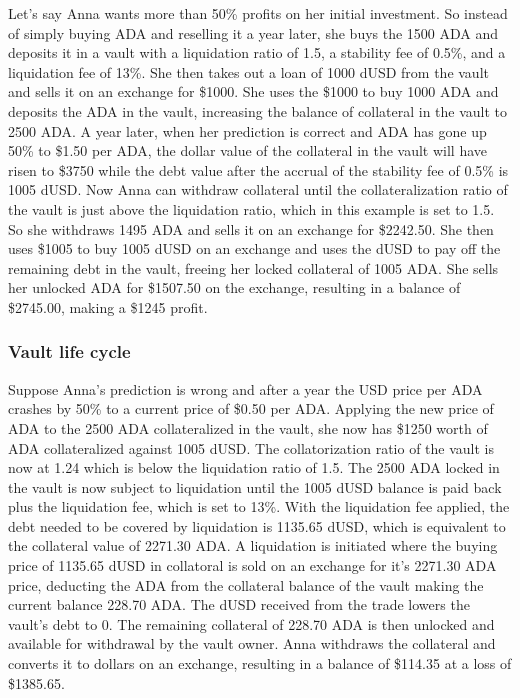 \documentclass[12pt]{article}
\begin{document}
Let's say Anna wants more than 50\% profits on her initial investment. So instead of simply buying ADA and reselling it a year later, she buys the 1500 ADA and deposits it in a vault with a liquidation ratio of 1.5, a stability fee of 0.5\%, and a liquidation fee of 13\%. She then takes out a loan of 1000 dUSD from the vault and sells it on an exchange for \$1000. She uses the \$1000 to buy 1000 ADA and deposits the ADA in the vault, increasing the balance of collateral in the vault to 2500 ADA. A year later, when her prediction is correct and ADA has gone up 50\% to \$1.50 per ADA, the dollar value of the collateral in the vault will have risen to \$3750 while the debt value after the accrual of the stability fee of 0.5\% is 1005 dUSD. Now Anna can withdraw collateral until the collateralization ratio of the vault is just above the liquidation ratio, which in this example is set to 1.5. So she withdraws 1495 ADA and sells it on an exchange for \$2242.50. She then uses \$1005 to buy 1005 dUSD on an exchange and uses the dUSD to pay off the remaining debt in the vault, freeing her locked collateral of 1005 ADA. She sells her unlocked ADA for \$1507.50 on the exchange, resulting in a balance of \$2745.00, making a \$1245 profit.

	\subsubsection{Vault life cycle}

Suppose Anna's prediction is wrong and after a year the USD price per ADA crashes by 50\% to a current price of \$0.50 per ADA. Applying the new price of ADA to the 2500 ADA collateralized in the vault, she now has \$1250 worth of ADA collateralized against 1005 dUSD. The collatorization ratio of the vault is now at 1.24 which is below the liquidation ratio of 1.5. The 2500 ADA locked in the vault is now subject to liquidation until the 1005 dUSD balance is paid back plus the liquidation fee, which is set to 13\%. With the liquidation fee applied, the debt needed to be covered by liquidation is 1135.65 dUSD, which is equivalent to the collateral value of 2271.30 ADA. A liquidation is initiated where the buying price of 1135.65 dUSD in collatoral is sold on an exchange for it's 2271.30 ADA price, deducting the ADA from the collateral balance of the vault making the current balance 228.70 ADA. The dUSD received from the trade lowers the vault's debt to 0. The remaining collateral of 228.70 ADA is then unlocked and available for withdrawal by the vault owner. Anna withdraws the collateral and converts it to dollars on an exchange, resulting in a balance of \$114.35 at a loss of \$1385.65.
\end{document}
